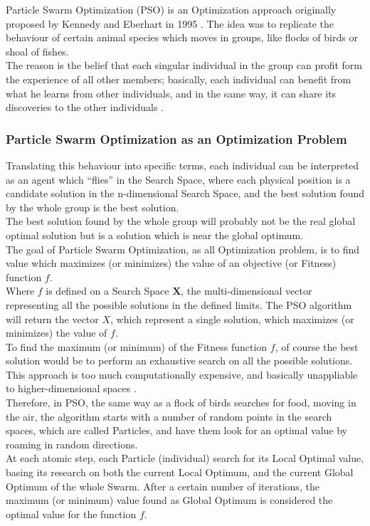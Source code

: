 Particle Swarm Optimization (PSO) is an Optimization approach originally proposed by Kennedy and Eberhart in 1995 \cite{Tesi-3.3}. The idea was to replicate the behaviour of certain animal species which moves in groups, like flocks of birds or shoal of fishes.
\\[0.3cm]The reason is the belief that each singular individual in the group can profit form the experience of all other members; basically, each individual can benefit from what he learns from other individuals, and in the same way, it can share its discoveries to the other individuals \cite{Tesi-3.1}.

\subsubsection{Particle Swarm Optimization as an Optimization Problem}

Translating this behaviour into specific terms, each individual can be interpreted as an agent which “flies” in the Search Space, where each physical position is a candidate solution in the n-dimensional Search Space, and the best solution found by the whole group is the best solution.
\\[0.3cm]The best solution found by the whole group will probably not be the real global optimal solution but is a solution which is near the global optimum.
% 
\\[0.3cm]The goal of Particle Swarm Optimization, as all Optimization problem, is to find value which maximizes (or minimizes) the value of an objective (or Fitness) function $f$.
\\[0.3cm]Where $f$ is defined on a Search Space {$\textbf{X}$}, the multi-dimensional vector representing all the possible solutions in the defined limits.
The PSO algorithm will return the vector $X$, which represent a single solution, which maximizes (or minimizes) the value of $f$.
% 
\\[0.3cm]To find the maximum (or minimum) of the Fitness function $f$, of course the best solution would be to perform an exhaustive search on all the possible solutions. This approach is too much computationally expensive, and basically unappliable to higher-dimensional spaces \cite{Tesi-3.1}.
\\[0.3cm]Therefore, in PSO, the same way as a flock of birds searches for food, moving in the air, the algorithm starts with a number of random points in the search spaces, which are called Particles, and have them look for an optimal value by roaming in random directions.
\\[0.3cm]At each atomic step, each Particle (individual) search for its Local Optimal value, basing its research on both the current Local Optimum, and the current Global Optimum of the whole Swarm.
After a certain number of iterations, the maximum (or minimum) value found as Global Optimum is considered the optimal value for the function $f$.

